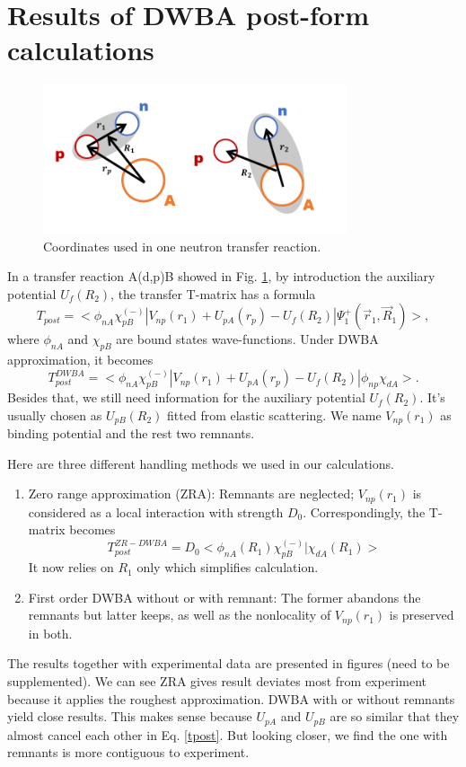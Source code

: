 \section{Results of DWBA post-form calculations}

\begin{figure}[t]
	\centering
	\includegraphics[width=0.80\textwidth]{transfer.png}
	\caption{Coordinates used in one neutron transfer reaction. }
	\label{fig:transfer}
\end{figure}
In a transfer reaction A(d,p)B showed in Fig. \ref{fig:transfer}, by introduction the auxiliary potential $U_f(R_2)$, the transfer T-matrix has a formula \cite{thompson2009nuclear}
\begin{equation}
	T_{post}=<\phi_{nA}\chi_{pB}^{(-)}\left|V_{np}(r_1)+U_{pA}(r_p)-U_f(R_2)\right|\Psi_1^+(\vec{r}_1,\vec{R}_1)>,
\end{equation}
where $\phi_{nA}$ and $\chi_{pB}$ are bound states wave-functions. 
Under DWBA approximation, it becomes
\begin{equation}\label{tpost}
	T_{post}^{DWBA}=<\phi_{nA}\chi_{pB}^{(-)}\left|V_{np}(r_1)+U_{pA}(r_p)-U_f(R_2)\right|\phi_{np}\chi_{dA}>.
\end{equation}
Besides that, we still need information for the auxiliary potential $U_f(R_2)$. 
It's usually chosen as $U_{pB}(R_2)$ fitted from elastic scattering.
We name $V_{np}(r_1)$ as binding potential and the rest two remnants.

Here are three different handling methods we used in our calculations.
\begin{enumerate}
\item Zero range approximation (ZRA): Remnants are neglected; $V_{np}(r_1)$ is considered as a local interaction with strength $D_0$.
	Correspondingly, the T-matrix becomes
	\begin{equation}
		T_{post}^{ZR-DWBA}=D_0<\phi_{nA}(R_1)\chi_{pB}^{(-)}| \chi_{dA}(R_1)>
	\end{equation}
	It now relies on $R_1$ only which simplifies calculation.
	\item First order DWBA without or with remnant: The former abandons the remnants but latter keeps, as well as the nonlocality of $V_{np}(r_1)$ is preserved in both.
\end{enumerate}

The results together with experimental data are presented in figures (need to be supplemented). 
We can see ZRA gives result deviates most from experiment because it applies the roughest approximation.
DWBA with or without remnants yield close results.
This makes sense because $U_{pA}$ and $U_{pB}$ are so similar that they almost cancel each other in Eq. \ref{tpost}.
But looking closer, we find the one with remnants is more contiguous to experiment.